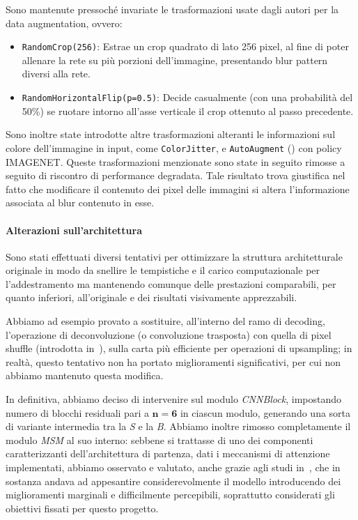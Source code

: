 \documentclass[a4paper,10pt,twocolumn]{article}
\begin{document}
Sono mantenute pressoché invariate le trasformazioni usate dagli autori per la data augmentation, ovvero:
\begin{itemize}
  \item \texttt{RandomCrop(256)}: Estrae un crop quadrato di lato 256 pixel, al fine di poter allenare la rete su pi\`u porzioni dell'immagine, presentando
    blur pattern diversi alla rete.
  \item \texttt{RandomHorizontalFlip(p=0.5)}: Decide casualmente (con una probabilità del 50\%) se ruotare intorno all'asse verticale il crop ottenuto al passo precedente.
\end{itemize}

Sono inoltre state introdotte altre trasformazioni alteranti le informazioni sul colore dell'immagine in input, come \texttt{ColorJitter},
e \texttt{AutoAugment} (\cite{cubuk2019autoaugmentlearningaugmentationpolicies}) con policy IMAGENET. Queste trasformazioni menzionate sono state in seguito rimosse a seguito di riscontro di performance degradata.
Tale risultato trova giustifica nel fatto che modificare il contenuto dei pixel delle immagini si altera l'informazione associata al blur contenuto in esse.


\paragraph{Alterazioni sull'architettura}
Sono stati effettuati diversi tentativi per ottimizzare la struttura architetturale originale in modo da snellire le tempistiche e il carico computazionale per l'addestramento ma mantenendo comunque delle
prestazioni comparabili, per quanto inferiori, all'originale e dei risultati visivamente apprezzabili.

Abbiamo ad esempio provato a sostituire, all'interno del ramo di decoding, l'operazione di deconvoluzione (o convoluzione trasposta) con quella di pixel shuffle (introdotta in~\cite{shi2016realtimesingleimagevideo}), 
sulla carta più efficiente per operazioni di upsampling; in realtà, questo tentativo non ha portato miglioramenti significativi, per cui non abbiamo mantenuto questa modifica.

In definitiva, abbiamo deciso di intervenire sul modulo \textit{CNNBlock}, impostando numero di blocchi residuali pari a \(\mathbf{n=6}\) in ciascun modulo, generando una sorta di variante intermedia tra la \textit{S} 
e la \textit{B}. Abbiamo inoltre rimosso completamente il modulo \textit{MSM} al suo interno: sebbene si trattasse di uno dei componenti caratterizzanti dell'architettura di partenza, dati i meccanismi di attenzione implementati,
abbiamo osservato e valutato, anche grazie agli studi in~\cite{convir}, che in sostanza andava ad appesantire considerevolmente il modello introducendo dei miglioramenti marginali e difficilmente percepibili,
soprattutto considerati gli obiettivi fissati per questo progetto.
\end{document}
